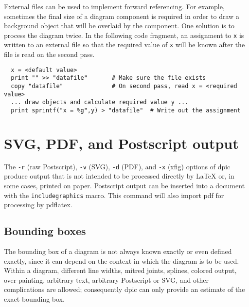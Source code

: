 \documentclass[11pt]{article}
\newcommand{\bq}{}
\newcommand{\dpic}{{\bq dpic}}
\newcommand{\tBS}{{\tt\char92}}
\begin{document}
  External files can be used to implement forward referencing.  For
  example, sometimes the final size of a diagram component is required in
  order to draw a background object that will be overlaid by the
  component.  One solution is to process the diagram twice.  In the
  following code fragment, an assignment to {\tt x} is written to an
  external file so that the required value of {\tt x} will be known after
  the file is read on the second pass.
\begin{verbatim}
  x = <default value>
  print "" >> "datafile"       # Make sure the file exists
  copy "datafile"              # On second pass, read x = <required value>
  ... draw objects and calculate required value y ...
  print sprintf("x = %g",y) > "datafile"  # Write out the assignment
\end{verbatim}
\iffalse
  Provided the diagram source is a file ({\tt test.pic}, for example),
  the second explicit call to \dpic\ can be avoided
  by modifying the above example to something like the following;
\begin{verbatim}
  filerecursion = 0 ; x = <default value>
  print "" >> "datafile" ; copy "datafile"
  ... draw objects and calculate required value y ...
  if filerecursion == 0 then {
    print sprintf("filerecursion = 1; x = %g",y) > "datafile"
    sh "dpic -p test.pic > test.tex" }
\end{verbatim}
\fi


\section{SVG, PDF, and Postscript output}\label{SVG:}

The {\tt-r} (raw Postscript),
{\tt-v} (SVG),
{\tt-d} (PDF),
and {\tt-x} (xfig) options
of dpic produce output that is not intended to be processed directly by LaTeX
or, in some cases, printed on paper.  Postscript output can be inserted
into a document with the {\tt \tBS{}includegraphics} macro. This command
will also import pdf for processing by pdflatex. 

\subsection{Bounding boxes}
  The bounding box of a diagram is not always known exactly or even defined
  exactly, since it can depend on the context in which the diagram is to be
  used.  Within a diagram, different line widths, mitred joints, splines,
  colored output, over-painting, arbitrary text, arbitrary Postscript or SVG,
  and other complications are allowed; consequently dpic can only provide an
  estimate of the exact bounding box.
\end{document}
